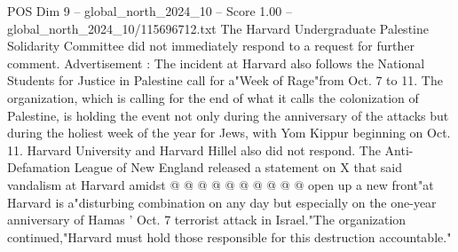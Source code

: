 \begin{textsample}{POS Dim 9 – global\_north\_2024\_10 – Score 1.00 – global\_north\_2024\_10/115696712.txt}
The Harvard Undergraduate Palestine Solidarity Committee did not immediately respond to a request for further comment.
Advertisement : The incident at Harvard also follows the National Students for Justice in Palestine call for a"Week of Rage"from Oct. 7 to 11.
The organization, which is calling for the end of what it calls the colonization of Palestine, is holding the event not only during the anniversary of the attacks but during the holiest week of the year for Jews, with Yom Kippur beginning on Oct. 11.
Harvard University and Harvard Hillel also did not respond.
The Anti-Defamation League of New England released a statement on X that said vandalism at Harvard amidst @ @ @ @ @ @ @ @ @ @ open up a new front"at Harvard is a"disturbing combination on any day but especially on the one-year anniversary of Hamas ' Oct. 7 terrorist attack in Israel."The organization continued,"Harvard must hold those responsible for this destruction accountable."

\end{textsample}
